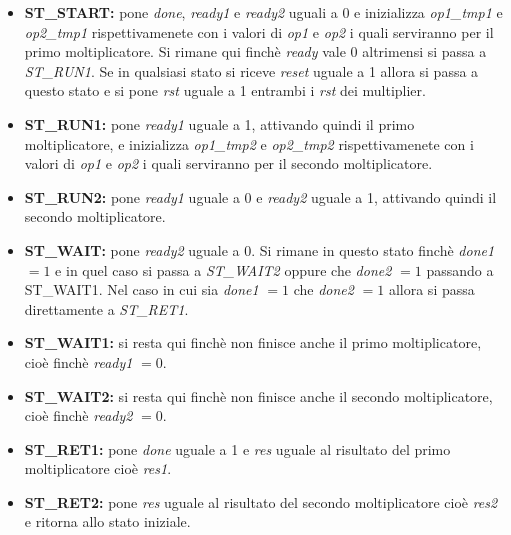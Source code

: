 \documentclass[]{IEEEtran}
\begin{document}
\begin{itemize}
    \item \textbf{ST\_START:} pone \textit{done}, \textit{ready1} e \textit{ready2} uguali a 0 e inizializza \textit{op1\_tmp1} e \textit{op2\_tmp1} rispettivamenete con i valori di \textit{op1} e \textit{op2} i quali serviranno per il primo moltiplicatore. Si rimane qui finchè \textit{ready} vale 0 altrimensi si passa a \textit{ST\_RUN1}. Se in qualsiasi stato si riceve \textit{reset} uguale a 1 allora si passa a questo stato e si pone \textit{rst} uguale a 1 entrambi i \textit{rst} dei multiplier.
    \item \textbf{ST\_RUN1:} pone \textit{ready1} uguale a 1, attivando quindi il primo moltiplicatore, e inizializza \textit{op1\_tmp2} e \textit{op2\_tmp2} rispettivamenete con i valori di \textit{op1} e \textit{op2} i quali serviranno per il secondo moltiplicatore.
    \item \textbf{ST\_RUN2:} pone \textit{ready1} uguale a 0 e \textit{ready2} uguale a 1, attivando quindi il secondo moltiplicatore.
    \item \textbf{ST\_WAIT:} pone \textit{ready2} uguale a 0. Si rimane in questo stato finchè \textit{done1} $=1$ e in quel caso si passa a \textit{ST\_WAIT2} oppure che \textit{done2} $=1$ passando a {ST\_WAIT1}. Nel caso in cui sia \textit{done1} $=1$ che \textit{done2} $=1$ allora si passa direttamente a \textit{ST\_RET1}.
    \item \textbf{ST\_WAIT1:} si resta qui finchè non finisce anche il primo moltiplicatore, cioè finchè \textit{ready1} $=0$.
    \item \textbf{ST\_WAIT2:} si resta qui finchè non finisce anche il secondo moltiplicatore, cioè finchè \textit{ready2} $=0$.
    \item \textbf{ST\_RET1:} pone \textit{done} uguale a 1 e \textit{res} uguale al risultato del primo moltiplicatore cioè \textit{res1}.
    \item \textbf{ST\_RET2:} pone \textit{res} uguale al risultato del secondo moltiplicatore cioè \textit{res2} e ritorna allo stato iniziale.
\end{itemize}
\end{document}
